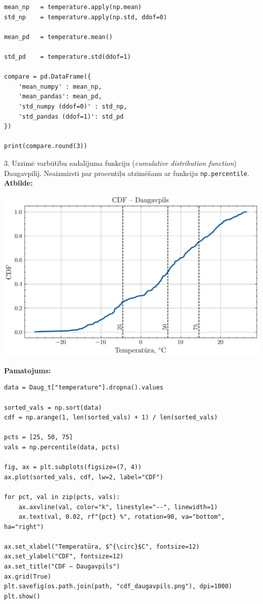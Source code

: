 \documentclass[12pt]{article}
\begin{document}
\begin{verbatim}
mean_np   = temperature.apply(np.mean)                       
std_np    = temperature.apply(np.std, ddof=0)              

mean_pd   = temperature.mean()                            

std_pd    = temperature.std(ddof=1)                        

compare = pd.DataFrame({
    'mean_numpy' : mean_np,
    'mean_pandas': mean_pd,
    'std_numpy (ddof=0)' : std_np,
    'std_pandas (ddof=1)': std_pd
})

print(compare.round(3))
\end{verbatim}

3. Uzzīmē varbūtību sadalījuma funkciju (\textit{cumulative distribution function}) Daugavpilij. Neaizmirsti par procentiļu atzīmēšanu ar funkciju \texttt{np.percentile}.\\ 

\textbf{Atbilde:}
\begin{center}
    \includegraphics[]{cdf_daugavpils.png}
\end{center}

\textbf{Pamatojums:}
\begin{verbatim}
data = Daug_t["temperature"].dropna().values

sorted_vals = np.sort(data)
cdf = np.arange(1, len(sorted_vals) + 1) / len(sorted_vals)

pcts = [25, 50, 75]
vals = np.percentile(data, pcts)

fig, ax = plt.subplots(figsize=(7, 4))
ax.plot(sorted_vals, cdf, lw=2, label="CDF")

for pct, val in zip(pcts, vals):
    ax.axvline(val, color="k", linestyle="--", linewidth=1)
    ax.text(val, 0.02, rf"{pct} %", rotation=90, va="bottom", ha="right")

ax.set_xlabel("Temperatūra, $^{\circ}$C", fontsize=12)
ax.set_ylabel("CDF", fontsize=12)
ax.set_title("CDF – Daugavpils")
ax.grid(True)
plt.savefig(os.path.join(path, "cdf_daugavpils.png"), dpi=1000)
plt.show()
\end{verbatim}
\end{document}
